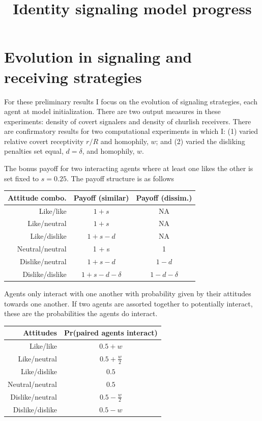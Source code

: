 \documentclass[11pt,letterpaper]{article}
\title{\vspace{-1in}Identity signaling model progress}
\author{} %
\begin{document}
\maketitle
\tableofcontents

\section{Evolution in signaling and receiving strategies}

For these preliminary results I focus on the evolution of signaling strategies,
each agent at model initialization. There are two output measures in these experiments:
density of covert signalers and density of churlish receivers. 
There are confirmatory results for two computational experiments in which I: 
(1) varied relative covert receptivity $r/R$ and 
homophily, $w$; and (2) varied the disliking penalties set equal, $d=\delta$,
and homophily, $w$.

The bonus payoff for two 
interacting agents where at least one
likes the other is set fixed to $s=0.25$. The payoff structure is as follows

\begin{table}[H]
  \centering
  \begin{tabular}{rcc}
    Attitude combo. & Payoff (similar) & Payoff (dissim.) \\
   \toprule
    Like/like & $1 + s$                    & NA \\
    Like/neutral & $1 + s$                 & NA \\
    Like/dislike & $1 + s - d$             & NA \\
    Neutral/neutral & 1 + s                & 1  \\
    Dislike/neutral & $1 + s - d$          & $1-d$\\
    Dislike/dislike & $1 + s - d - \delta$ & $1 - d - \delta$
  \end{tabular}
\end{table}

Agents only interact with one another with probability given by their attitudes
towards one another. If two agents are assorted together to potentially 
interact, these are the probabilities the agents do interact.

\begin{table}[H]
  \centering
  \begin{tabular}{rc}
    Attitudes & Pr(paired agents interact) \\
    \toprule
    Like/like & $0.5 + w$ \\
    Like/neutral & $0.5 + \frac{w}{2}$ \\
    Like/dislike & $0.5$ \\
    Neutral/neutral & $0.5$ \\
    Dislike/neutral & $0.5 - \frac{w}{2}$ \\
    Dislike/dislike & $0.5 - w$ 
  \end{tabular}
\end{table}
\end{document}
